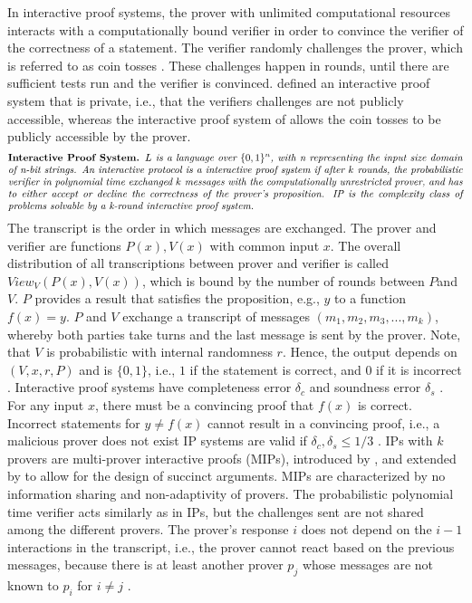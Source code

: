 In interactive proof systems, the prover with unlimited computational resources interacts with a computationally bound verifier in order to convince the verifier of the correctness of a statement. The verifier randomly challenges the prover, which is referred to as coin tosses \citep{GoldwasserCoinTosses}. These challenges happen in rounds, until there are sufficient tests run and the verifier is convinced. \citet{GoldwasserIPs} defined an interactive proof system that is private, i.e., that the verifiers challenges are not publicly accessible, whereas the interactive proof system of \citet{BabaiIPs} allows the coin tosses to be publicly accessible by the prover.
\begin{align*}
    \text{\parbox{450pt}{\textbf{Interactive Proof System.} \textit{\(L\) is a language over \(\{0,1\}^n\), with n representing the input size domain of n-bit strings. An interactive protocol is a interactive proof system if after \(k\) rounds, the probabilistic verifier in polynomial time exchanged \(k\) messages with the computationally unrestricted prover, and has to either accept or decline the correctness of the prover's proposition. IP is the complexity class of problems solvable by a k-round interactive proof system.}}}
\end{align*}
The transcript is the order in which messages are exchanged. The prover and verifier are functions \(P(x), V(x)\) with common input \(x\). The overall distribution of all transcriptions between prover and verifier is called \(View_V(P(x), V(x))\), which is bound by the number of rounds between \(P\)and \(V\). \(P\) provides a result that satisfies the proposition, e.g., \(y\) to a function \(f(x) = y\). \(P\) and \(V\) exchange a transcript of messages \((m_1, m_2, m_3, ..., m_k)\), whereby both parties take turns and the last message is sent by the prover. Note, that \(V\) is probabilistic with internal randomness \(r\). Hence, the output depends on \((V, x, r, P)\) and is \(\{0,1\}\), i.e., \(1\) if the statement is correct, and \(0\) if it is incorrect \citep{GoldwasserIPs, BabaiIPs}. Interactive proof systems have completeness error \(\delta_c\) and soundness error \(\delta_s\) . For any input \(x\), there must be a convincing proof that \(f(x)\) is correct. Incorrect statements for \(y \neq f(x)\) cannot result in a convincing proof, i.e., a malicious prover does not exist IP systems are valid if \(\delta_c, \delta_s \leq 1/3\) \citep{Thaler}. IPs with \(k\) provers are multi-prover interactive proofs (MIPs), introduced by \citet{MIPsBen}, and extended by \citet{MIPsSetty} to allow for the design of succinct arguments. MIPs are characterized by no information sharing and non-adaptivity of provers. The probabilistic polynomial time verifier acts similarly as in IPs, but the challenges sent are not shared among the different provers. The prover's response \(i\) does not depend on the \(i-1\) interactions in the transcript, i.e., the prover cannot react based on the previous messages, because there is at least another prover \(p_j\) whose messages are not known to \(p_i\) for \(i\neq j\) .

